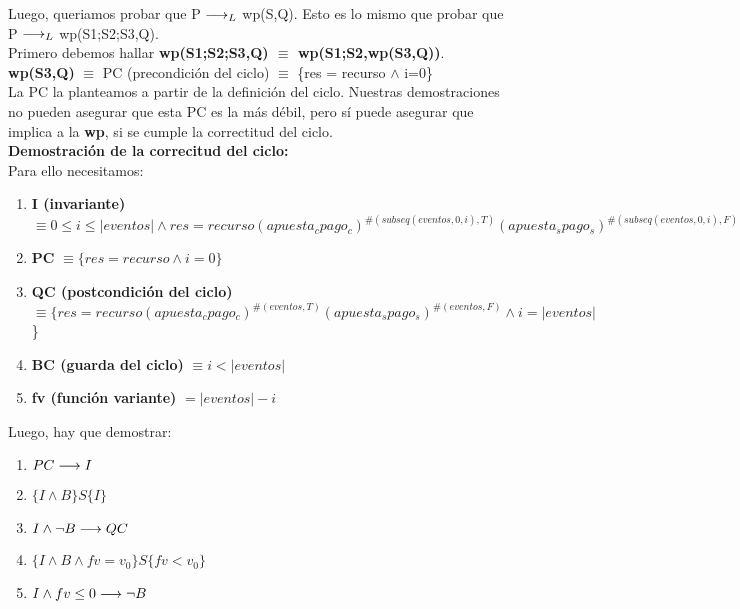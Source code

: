 \documentclass[10pt,a4paper]{article}
\begin{document}
\begin{flushleft}
\vspace{3mm}
Luego, queriamos probar que P $\longrightarrow _L$ wp(S,Q). Esto es lo mismo que probar que P $\longrightarrow _L$ wp(S1;S2;S3,Q).\\
\vspace{3mm}
Primero debemos hallar \textbf{wp(S1;S2;S3,Q) $\equiv$ wp(S1;S2,wp(S3,Q))}.\\
\vspace{3mm}
\textbf{wp(S3,Q)} $\equiv$ PC (precondición del ciclo) $\equiv$ \{res = recurso $\wedge$ i=0\}\\
\vspace{3mm}
La PC la planteamos a partir de la definición del ciclo. 
Nuestras demostraciones no pueden asegurar que esta PC es la más débil, 
pero sí puede asegurar que implica a la \textbf{wp}, si se cumple la correctitud del ciclo.\\
\vspace{10mm}
\textbf{Demostración de la correcitud del ciclo:}\\
\vspace{3mm}
Para ello necesitamos: 
\begin{enumerate} \setlength\itemsep{0cm}
	\item \textbf{I (invariante)} $\equiv 0\leq i \leq |eventos| \wedge res=recurso(apuesta_cpago_c)^{\#(subseq(eventos,0,i),T)}(apuesta_spago_s)^{\#(subseq(eventos,0,i),F)}$
	\item \textbf{PC} $\equiv \{res= recurso \wedge i=0\}$
	\item \textbf{QC (postcondición del ciclo)} $\equiv \{res=recurso(apuesta_cpago_c)^{\#(eventos,T)}(apuesta_spago_s)^{\#(eventos,F)} \wedge i=|eventos|$\}
	\item \textbf{BC (guarda del ciclo)} $\equiv i < |eventos|$
	\item \textbf{fv (función variante)} $= |eventos|-i$
\end{enumerate}

Luego, hay que demostrar:
\begin{enumerate} \setlength\itemsep{0cm}
	\item \textbf{$PC \longrightarrow I$}
	\item \textbf{$\{ I \wedge B \}S\{ I \}$}
	\item \textbf{$I \wedge \neg B \longrightarrow QC$}
	\item \textbf{$\{ I \wedge B \wedge fv= v_0 \}S\{ fv<v_0 \}$}
	\item \textbf{$I \wedge fv\leq0 \longrightarrow \neg B$} 

\end{enumerate}


\end{flushleft}
\end{document}
